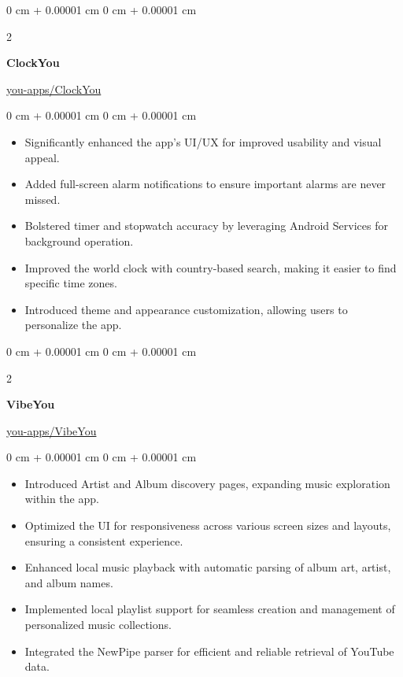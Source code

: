 \documentclass[10pt, letterpaper]{article}
\newenvironment{highlights}{
	\begin{itemize}[
		topsep=0.10 cm,
		parsep=0.10 cm,
		partopsep=0pt,
		itemsep=0pt,
		leftmargin=0 cm + 10pt
		]
	}{
	\end{itemize}
} %
\newenvironment{onecolentry}{
	\begin{adjustwidth}{
			0 cm + 0.00001 cm
		}{
			0 cm + 0.00001 cm
		}
	}{
	\end{adjustwidth}
} %
\newenvironment{twocolentry}[2][]{
	\onecolentry
	\def\secondColumn{#2}
	\setcolumnwidth{\fill, 4.5 cm}
	\begin{paracol}{2}
	}{
		\switchcolumn \raggedleft \secondColumn
	\end{paracol}
	\endonecolentry
} %
\begin{document}
	\vspace{0.2 cm}
	
			\begin{twocolentry}{\href{https://github.com/you-apps/ClockYou}{you-apps/ClockYou}}
		\textbf{ClockYou}
	\end{twocolentry}
	\vspace{0.10 cm}
	\begin{onecolentry}
		\begin{highlights}
			\item Significantly enhanced the app's UI/UX for improved usability and visual appeal.
			\item Added full-screen alarm notifications to ensure important alarms are never missed.
			\item Bolstered timer and stopwatch accuracy by leveraging Android Services for background operation.
			\item Improved the world clock with country-based search, making it easier to find specific time zones.
			\item Introduced theme and appearance customization, allowing users to personalize the app.
		\end{highlights}
	\end{onecolentry}
	
	\vspace{0.2 cm}
	
			\begin{twocolentry}{\href{https://github.com/you-apps/VibeYou}{you-apps/VibeYou}}
		\textbf{VibeYou}
	\end{twocolentry}
	\vspace{0.10 cm}
	\begin{onecolentry}
		\begin{highlights}
			\item Introduced Artist and Album discovery pages, expanding music exploration within the app.
			\item Optimized the UI for responsiveness across various screen sizes and layouts, ensuring a consistent experience.
			\item Enhanced local music playback with automatic parsing of album art, artist, and album names.
			\item Implemented local playlist support for seamless creation and management of personalized music collections.
			\item Integrated the NewPipe parser for efficient and reliable retrieval of YouTube data.
		\end{highlights}
	\end{onecolentry}
	
\end{document}
